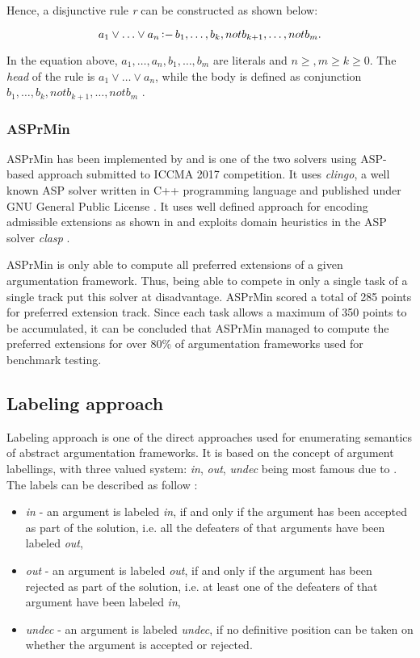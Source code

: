Hence, a disjunctive rule \textit{r} can be constructed as shown below:

\begin{equation}
	a_1 \lor \ldots \lor a_n \mathop{\vcenter{\hbox{$:$}}-} b_1, \ldots, b_k, not b_{k+1}, \ldots, not b_m.
\end{equation}

In the equation above, $ a_1, \ldots, a_n, b_1, \ldots, b_m$ are literals and $ n \geq , m \geq k \geq 0$. The \textit{head} of the rule is $ a_1 \lor \ldots \lor a_n $, while the body is defined as conjunction $ b_1, \ldots, b_k, not b_{k+1}, \ldots, not b_m $ \citep{bonattiASP}.


\subsubsection{ASPrMin}
ASPrMin has been implemented by \citet{asprmin} and is one of the two solvers using ASP-based approach submitted to ICCMA 2017 competition. It uses \textit{clingo}, a well known ASP solver written in C++ programming language and published under GNU General Public License \citep{clingo}. It uses well defined approach for encoding admissible extensions as shown in \citet{asp3} and exploits domain heuristics in the ASP solver \textit{clasp} \citep{asprmin}.

ASPrMin is only able to compute all preferred extensions of a given argumentation framework. Thus, being able to compete in only a single task of a single track put this solver at disadvantage. ASPrMin scored a total of 285 points for preferred extension track. Since each task allows a maximum of 350 points to be accumulated, it can be concluded that ASPrMin managed to compute the preferred extensions for over 80\% of argumentation frameworks used for benchmark testing.

\subsection{Labeling approach}
Labeling approach is one of the direct approaches used for enumerating semantics of abstract argumentation frameworks. It is based on the concept of argument labellings, with three valued system: \textit{in}, \textit{out}, \textit{undec} being most famous due to \citet{caminadaLabeling}. The labels can be described as follow \citep{caminada2008gentle}:

\begin{itemize}
	\item \textit{in} - an argument is labeled \textit{in}, if and only if the argument has been accepted as part of the solution, i.e. all the defeaters of that arguments have been labeled \textit{out},
	\item \textit{out} - an argument is labeled \textit{out}, if and only if the argument has been rejected as part of the solution, i.e. at least one of the defeaters of that argument have been labeled \textit{in},
	\item \textit{undec} - an argument is labeled \textit{undec}, if no definitive position can be taken on whether the argument is accepted or rejected.
\end{itemize}

